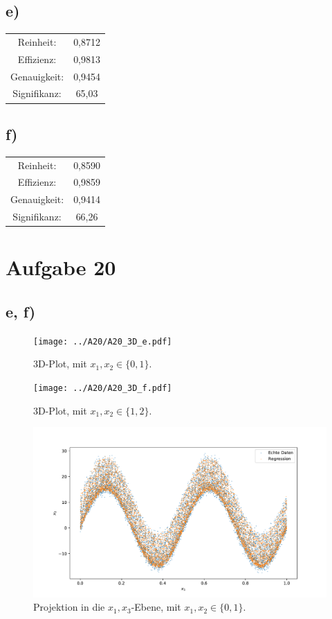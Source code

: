 \documentclass[a4paper, 11pt]{article}
\begin{document}
\subsection*{e)}
\begin{center}
    \begin{tabular}{cc}
        Reinheit: & 0,8712\\
        Effizienz: & 0,9813\\
        Genauigkeit: & 0,9454\\
        Signifikanz: & 65,03\\
    \end{tabular}
\end{center}

\subsection*{f)}
\begin{center}
    \begin{tabular}{cc}
        Reinheit: & 0,8590\\
        Effizienz: & 0,9859\\
        Genauigkeit: & 0,9414\\
        Signifikanz: & 66,26\\
    \end{tabular}
\end{center}

\section*{Aufgabe 20}
\subsection*{e, f)}
\FloatBarrier
\begin{figure}
    \centering
    \texttt{[image: ../A20/A20\_3D\_e.pdf]}
    \caption{3D-Plot, mit $x_1, x_2\in\{0, 1\}$.}
\end{figure}

\begin{figure}
    \centering
    \texttt{[image: ../A20/A20\_3D\_f.pdf]}
    \caption{3D-Plot, mit $x_1, x_2\in\{1, 2\}$.}
\end{figure}

\begin{figure}
    \centering
    \includegraphics[width=\textwidth]{../A20/A20_x1_x3_e.pdf}
    \caption{Projektion in die $x_1, x_3$-Ebene, mit $x_1, x_2\in\{0, 1\}$.}
\end{figure}
\end{document}
